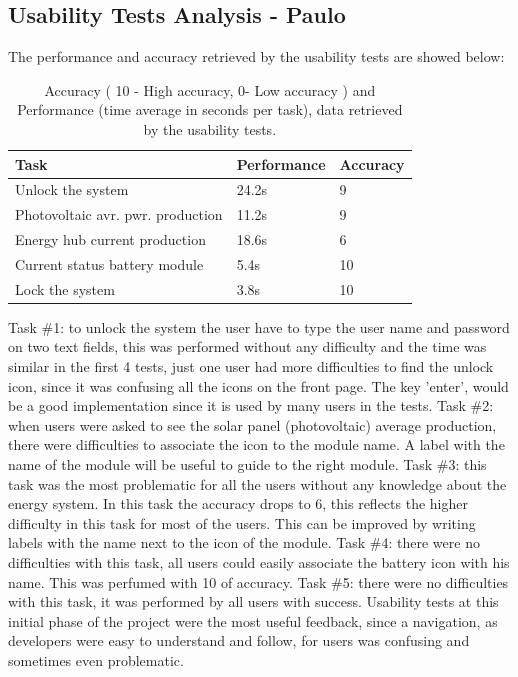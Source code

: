 \subsection{Usability Tests Analysis - Paulo}

The performance and accuracy retrieved by the usability tests are showed below:\\
	
\begin{table}[H]
\begin{tabular}{ | l | l | l |}
	\hline
	Task 					      & 	Performance 	& 	Accuracy 		\\ \hline
	Unlock the system 			      & 	24.2s		& 	9			\\ \hline
	Photovoltaic avr. pwr. production   &		11.2s	    	& 	9			\\ \hline
	Energy hub current production 	      & 	18.6s		&	6 			\\ \hline
	Current status battery module 	      & 	5.4s			& 	10			\\ \hline
	Lock the system 			      & 	3.8s			& 	10			\\ \hline
\end{tabular}
\caption{Accuracy ( 10 - High accuracy, 0- Low accuracy ) and Performance (time average in seconds per task), data retrieved by the usability tests.}
\end{table}

\noindent Task \#1: to unlock the system the user have to type the user name and password on two text fields, this was performed without any difficulty and the time was similar in the first 4 tests, just one user had more difficulties to find  the unlock icon, since it was confusing all the icons on the front page. The key 'enter', would be a good implementation since it is used by many users in the tests.\p
Task \#2: when users were asked to see the solar panel (photovoltaic) average production, there were difficulties to associate the icon to the module name. A label with the name of the module will be useful to guide to the right module.\p
Task \#3: this task was the most problematic for all the users without any knowledge about the energy system. In this task the accuracy drops to 6, this reflects the higher difficulty in this task for most of the users. This can be improved by writing labels with the name next to the icon of the module.\p
Task \#4: there were no difficulties with this task, all users could easily associate the battery icon with his name. This was perfumed with 10 of accuracy.\p
Task \#5: there were no difficulties with this task, it was performed by all users with success.\p
Usability tests at this initial phase of the project were the most useful feedback, since a navigation, as developers were easy to understand and follow, for users was confusing and sometimes even problematic.\p

